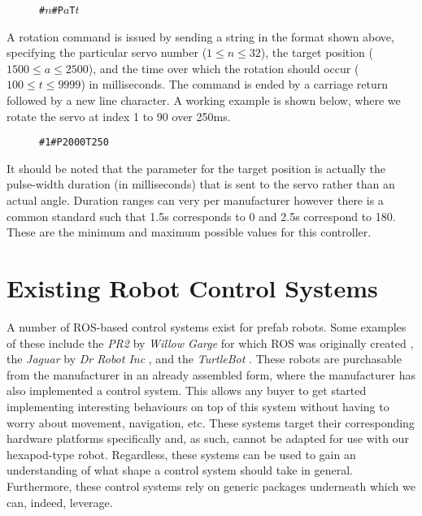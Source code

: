 \begin{figure}[!h]
    \centering
    \texttt{\#\(n\)\#P\(a\)T\(t\)}
\end{figure}

A rotation command is issued by sending a string in the format shown above, specifying the particular servo number ($1 \leq n \leq 32$), the target position ($1500 \leq a \leq 2500$), and the time over which the rotation should occur ($100 \leq t \leq 9999$) in milliseconds. The command is ended by a carriage return followed by a new line character. A working example is shown below, where we rotate the servo at index 1 to 90\textdegree{} over 250ms.

\begin{figure}[!h]
    \centering
    \texttt{\#1\#P2000T250}
\end{figure}

It should be noted that the parameter for the target position is actually the pulse-width duration (in milliseconds) that is sent to the servo rather than an actual angle. Duration ranges can very per manufacturer however there is a common standard such that 1.5\textmu s corresponds to 0\textdegree{} and 2.5\textmu s correspond to 180\textdegree. These are the minimum and maximum possible values for this controller. 


\section{Existing Robot Control Systems}

A number of ROS-based control systems exist for prefab robots. Some examples of these include the \emph{PR2} by \emph{Willow Garge} for which ROS was originally created \cite{ros_pr2}, the \emph{Jaguar} by \emph{Dr Robot Inc} \cite{jag}, and the \emph{TurtleBot} \cite{turtlebot}. These robots are purchasable from the manufacturer in an already assembled form, where the manufacturer has also implemented a control system. This allows any buyer to get started implementing interesting behaviours on top of this system without having to worry about movement, navigation, etc. These systems target their corresponding hardware platforms specifically and, as such, cannot be adapted for use with our hexapod-type robot. Regardless, these systems can be used to gain an understanding of what shape a control system should take in general. Furthermore, these control systems rely on generic packages underneath which we can, indeed, leverage.

